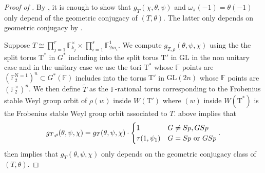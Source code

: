 \documentclass[12pt, reqno]{amsart}
\theoremstyle{definition}
\theoremstyle{definition}
\theoremstyle{definition}
\newcommand{\multiplicativegroup}[1]{#1^{\times}}
\newcommand{\GL}{\mathrm{GL}}
\newcommand{\aFieldNorm}{\mathrm{N}}
\newcommand{\finiteField}{\mathbb{F}}
\newcommand{\finiteFieldExtension}[1]{\finiteField_{#1}}
\newcommand{\NormOneGroup}[1]{\finiteFieldExtension{#1}^{\aFieldNorm = 1}}
\newcommand{\algebraicGroup}[1]{\boldsymbol{\mathrm{#1}}}
\begin{document}
\begin{proof}[Proof of ] 
By , it is enough to show that $g_{T}(\chi,\theta,\psi)$ and $\omega_{\pi}(-1) = \theta(-1)$ only depend of the geometric conjugacy of $(T,\theta)$. The latter only depends on geometric conjugacy by .

Suppose $T \cong \prod_{j=1}^r \multiplicativegroup{\finiteFieldExtension{k_j}} \times \prod_{i=1}^s \finiteFieldExtension{2m_i}^1$. We compute $g_{T,\rho}(\theta,\psi,\chi)$ using the the split torus $\algebraicGroup{T}^*$ in $G^*$ including into the split torus $\algebraicGroup{T}'$ in $\GL$ in the non unitary case and in the unitary case we use the tori $\algebraicGroup{T}^*$ whose $\finiteField$ points are $(\NormOneGroup{2})^n \subset G^*(\finiteField)$ includes into the torus $\algebraicGroup{T}'$ in $\GL(2n)$ whose $\finiteField$ points are $(\finiteFieldExtension{2}^\times)^n$. We then define $\tilde{T}$ as the $\finiteField$-rational torus corresponding to the Frobenius stable Weyl group orbit of $\rho(w)$ inside $W(\algebraicGroup{T}')$ where $(w)$ inside $W(\algebraicGroup{T}^*)$ is the Frobenius stable Weyl group orbit associated to $T$.  above implies that
\[
g_{T,\rho}(\theta,\psi,\chi)= g_{T}(\theta,\psi,\chi) \cdot \begin{cases}
        1  & G \neq Sp, GSp\\
        \tau(1,\psi_1) & G = Sp \textnormal{ or } GSp
    \end{cases}.
\]
 then implies that $g_T(\theta,\psi,\chi)$ only depends on the geometric conjugacy class of $(T,\theta)$.   
\begin{comment}
We will have to treat the unitary group case seperatedly. First for the non-unitary group case:\\




\end{comment}
\end{proof}
\end{document}
